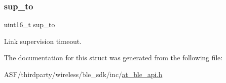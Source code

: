 \subsubsection{\texorpdfstring{sup\_to}{sup\_to}}
{\footnotesize\ttfamily uint16\+\_\+t sup\+\_\+to}



Link supervision timeout. 



The documentation for this struct was generated from the following file\+:\begin{DoxyCompactItemize}
\item 
A\+S\+F/thirdparty/wireless/ble\+\_\+sdk/inc/\mbox{\hyperlink{at__ble__api_8h}{at\+\_\+ble\+\_\+api.\+h}}\end{DoxyCompactItemize}
